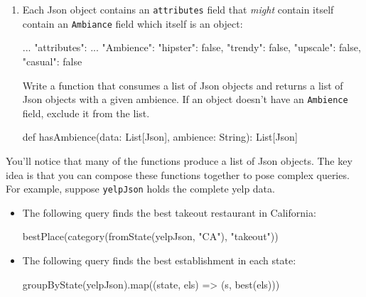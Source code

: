 \begin{enumerate}
    \item Each Json object contains an \texttt{attributes} field that
    \textit{might} contain itself contain an \texttt{Ambiance} field which
    itself is an object:
    \begin{scalacode}
    {   ...
        "attributes": {
            ...
            "Ambience": {
                "hipster": false,
                "trendy": false,
                "upscale": false,
                "casual": false
            }
        }
    }
    \end{scalacode}
    Write a function that consumes a list of Json objects and returns a list
    of Json objects with a given ambience. If an object doesn't have an
    \texttt{Ambience} field, exclude it from the list.
    \begin{scalacode}
    def hasAmbience(data: List[Json], ambience: String): List[Json]
    \end{scalacode}

\end{enumerate}

\noindent You'll notice that many of the functions produce a list of Json
objects. The key idea is that you can compose these functions together to
pose complex queries. For example, suppose \texttt{yelpJson} holds the
complete yelp data.

\begin{itemize}
\item The following query finds the best takeout restaurant in California:
    \begin{scalacode}
    bestPlace(category(fromState(yelpJson, "CA"), "takeout"))
    \end{scalacode}

\item The following query finds the best establishment in each state:
    \begin{scalacode}
    groupByState(yelpJson).map((state, els) => (s, best(els)))
    \end{scalacode}
\end{itemize}


